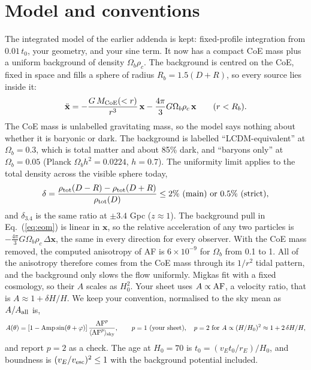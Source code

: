 \documentclass[10pt,letterpaper]{article}
\begin{document}
\section{Model and conventions}
The integrated model of the earlier addenda is kept: fixed-profile integration from $0.01\,t_0$, your geometry, and your sine term. It now has a compact CoE mass plus a uniform background of density $\Omega_b\rho_c$. The background is centred on the CoE, fixed in space and fills a sphere of radius $R_b=1.5(D+R)$, so every source lies inside it:
\begin{equation}\label{eq:eom}
\ddot{\mathbf x}=-\frac{G\,M_{\rm CoE}(<r)}{r^3}\,\mathbf x-\frac{4\pi}{3}G\Omega_b\rho_c\,\mathbf x \qquad (r<R_b).
\end{equation}
The CoE mass is unlabelled gravitating mass, so the model says nothing about whether it is baryonic or dark. The background is labelled ``LCDM-equivalent'' at $\Omega_b=0.3$, which is total matter and about 85\% dark, and ``baryons only'' at $\Omega_b=0.05$ (Planck $\Omega_bh^2=0.0224$, $h=0.7$). The uniformity limit applies to the total density across the visible sphere today,
\begin{equation}\label{eq:contrast}
\delta=\frac{\rho_{\rm tot}(D-R)-\rho_{\rm tot}(D+R)}{\rho_{\rm tot}(D)}\le 2\%\ \text{(main) or}\ 0.5\%\ \text{(strict)},
\end{equation}
and $\delta_{3.4}$ is the same ratio at $\pm3.4$ Gpc ($z\approx1$). The background pull in Eq.~(\ref{eq:eom}) is linear in $\mathbf x$, so the relative acceleration of any two particles is $-\tfrac{4\pi}{3}G\Omega_b\rho_c\,\Delta\mathbf x$, the same in every direction for every observer. With the CoE mass removed, the computed anisotropy of AF is $6\times10^{-9}$ for $\Omega_b$ from 0.1 to 1. All of the anisotropy therefore comes from the CoE mass through its $1/r^2$ tidal pattern, and the background only slows the flow uniformly. Migkas fit with a fixed cosmology, so their $A$ scales as $H_0^2$. Your sheet uses $A\propto{\rm AF}$, a velocity ratio, that is $A\approx1+\delta H/H$. We keep your convention, normalised to the sky mean as $A/A_{\rm all}$ is,
\begin{equation}\label{eq:A}
A(\theta)=\left[1-{\rm Amp}\sin(\theta+\varphi)\right]\frac{{\rm AF}^{p}}{\langle{\rm AF}^{p}\rangle_{\rm sky}},\qquad p=1\ \text{(your sheet)},\quad p=2\ \text{for}\ A\propto(H/H_0)^2\approx1+2\,\delta H/H,
\end{equation}
and report $p=2$ as a check. The age at $H_0=70$ is $t_0=(v_Et_0/r_E)/H_0$, and boundness is $(v_E/v_{\rm esc})^2\le1$ with the background potential included.
\end{document}

